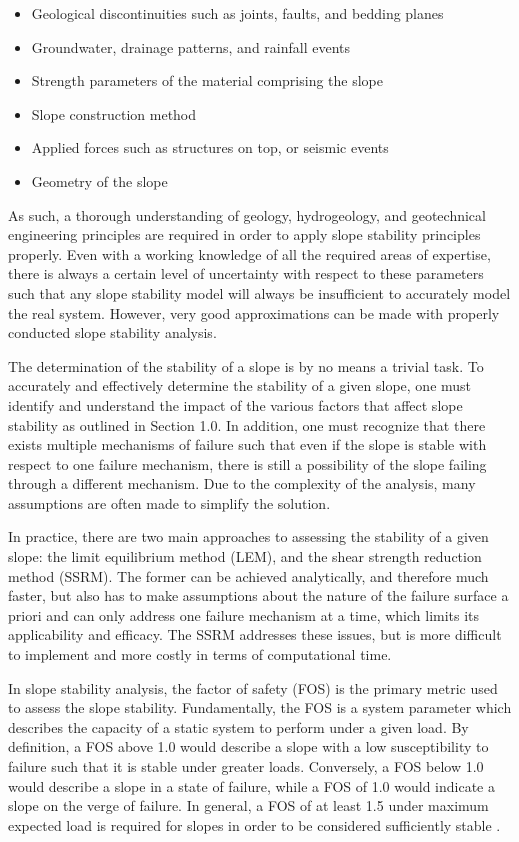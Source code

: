 \begin{itemize}
\item Geological discontinuities such as joints, faults, and bedding planes
\item Groundwater, drainage patterns, and rainfall events
\item Strength parameters of the material comprising the slope
\item Slope construction method
\item Applied forces such as structures on top, or seismic events
\item Geometry of the slope
\end{itemize}

As such, a thorough understanding of geology, hydrogeology, and geotechnical engineering principles are required in order to apply slope stability principles properly. Even with a working knowledge of all the required areas of expertise, there is always a certain level of uncertainty with respect to these parameters such that any slope stability model will always be insufficient to accurately model the real system. However, very good approximations can be made with properly conducted slope stability analysis.

The determination of the stability of a slope is by no means a trivial task. To accurately and effectively determine the stability of a given slope, one must identify and understand the impact of the various factors that affect slope stability as outlined in Section 1.0. In addition, one must recognize that there exists multiple mechanisms of failure such that even if the slope is stable with respect to one failure mechanism, there is still a possibility of the slope failing through a different mechanism. Due to the complexity of the analysis, many assumptions are often made to simplify the solution. 

In practice, there are two main approaches to assessing the stability of a given slope: the limit equilibrium method (LEM), and the shear strength reduction method (SSRM). The former can be achieved analytically, and therefore much faster, but also has to make assumptions about the nature of the failure surface a priori and can only address one failure mechanism at a time, which limits its applicability and efficacy. The SSRM addresses these issues, but is more difficult to implement and more costly in terms of computational time. 

In slope stability analysis, the factor of safety (FOS) is the primary metric used to assess the slope stability. Fundamentally, the FOS is a system parameter which describes the capacity of a static system to perform under a given load. By definition, a FOS above 1.0 would describe a slope with a low susceptibility to failure such that it is stable under greater loads. Conversely, a FOS below 1.0 would describe a slope in a state of failure, while a FOS of 1.0 would indicate a slope on the verge of failure. In general, a FOS of at least 1.5 under maximum expected load is required for slopes in order to be considered sufficiently stable \citep{das_principles_2009}.

